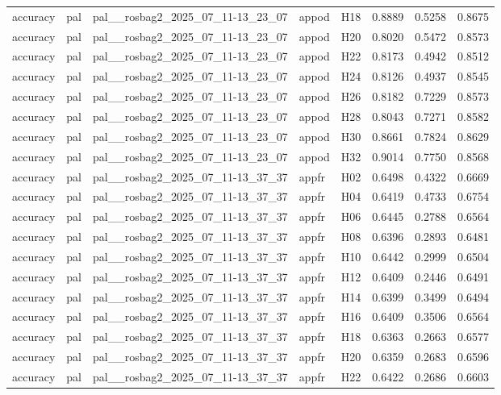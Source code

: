 \begin{table}[tbp]
\begin{tabular}{lllllrrr}
accuracy & pal & pal\_\_rosbag2\_2025\_07\_11-13\_23\_07 & appod & H18 & 0.8889 & 0.5258 & 0.8675 \\
accuracy & pal & pal\_\_rosbag2\_2025\_07\_11-13\_23\_07 & appod & H20 & 0.8020 & 0.5472 & 0.8573 \\
accuracy & pal & pal\_\_rosbag2\_2025\_07\_11-13\_23\_07 & appod & H22 & 0.8173 & 0.4942 & 0.8512 \\
accuracy & pal & pal\_\_rosbag2\_2025\_07\_11-13\_23\_07 & appod & H24 & 0.8126 & 0.4937 & 0.8545 \\
accuracy & pal & pal\_\_rosbag2\_2025\_07\_11-13\_23\_07 & appod & H26 & 0.8182 & 0.7229 & 0.8573 \\
accuracy & pal & pal\_\_rosbag2\_2025\_07\_11-13\_23\_07 & appod & H28 & 0.8043 & 0.7271 & 0.8582 \\
accuracy & pal & pal\_\_rosbag2\_2025\_07\_11-13\_23\_07 & appod & H30 & 0.8661 & 0.7824 & 0.8629 \\
accuracy & pal & pal\_\_rosbag2\_2025\_07\_11-13\_23\_07 & appod & H32 & 0.9014 & 0.7750 & 0.8568 \\
accuracy & pal & pal\_\_rosbag2\_2025\_07\_11-13\_37\_37 & appfr & H02 & 0.6498 & 0.4322 & 0.6669 \\
accuracy & pal & pal\_\_rosbag2\_2025\_07\_11-13\_37\_37 & appfr & H04 & 0.6419 & 0.4733 & 0.6754 \\
accuracy & pal & pal\_\_rosbag2\_2025\_07\_11-13\_37\_37 & appfr & H06 & 0.6445 & 0.2788 & 0.6564 \\
accuracy & pal & pal\_\_rosbag2\_2025\_07\_11-13\_37\_37 & appfr & H08 & 0.6396 & 0.2893 & 0.6481 \\
accuracy & pal & pal\_\_rosbag2\_2025\_07\_11-13\_37\_37 & appfr & H10 & 0.6442 & 0.2999 & 0.6504 \\
accuracy & pal & pal\_\_rosbag2\_2025\_07\_11-13\_37\_37 & appfr & H12 & 0.6409 & 0.2446 & 0.6491 \\
accuracy & pal & pal\_\_rosbag2\_2025\_07\_11-13\_37\_37 & appfr & H14 & 0.6399 & 0.3499 & 0.6494 \\
accuracy & pal & pal\_\_rosbag2\_2025\_07\_11-13\_37\_37 & appfr & H16 & 0.6409 & 0.3506 & 0.6564 \\
accuracy & pal & pal\_\_rosbag2\_2025\_07\_11-13\_37\_37 & appfr & H18 & 0.6363 & 0.2663 & 0.6577 \\
accuracy & pal & pal\_\_rosbag2\_2025\_07\_11-13\_37\_37 & appfr & H20 & 0.6359 & 0.2683 & 0.6596 \\
accuracy & pal & pal\_\_rosbag2\_2025\_07\_11-13\_37\_37 & appfr & H22 & 0.6422 & 0.2686 & 0.6603 \\

\end{tabular}
\end{table}
